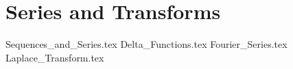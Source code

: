 \section{Series and Transforms}

{Sequences_and_Series.tex}
{Delta_Functions.tex}
{Fourier_Series.tex}
{Laplace_Transform.tex}